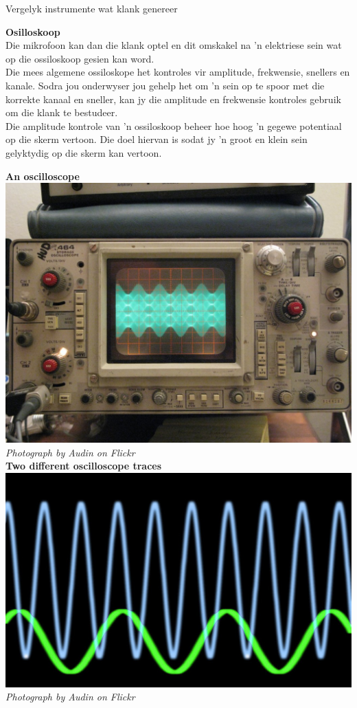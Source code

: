 \begin{activity}{Vergelyk instrumente wat klank genereer}
\begin{minipage}{.5\textwidth}

\textbf{Osilloskoop} \\
Die mikrofoon kan dan die klank optel en dit omskakel na 'n elektriese sein wat op die ossiloskoop gesien kan word.\\

Die mees algemene ossiloskope het kontroles vir amplitude, frekwensie, snellers en kanale. Sodra jou onderwyser jou gehelp het om 'n sein op te spoor met die korrekte kanaal en sneller, kan jy die amplitude en frekwensie kontroles gebruik om die klank te bestudeer.\\

Die amplitude kontrole van 'n ossiloskoop beheer hoe hoog 'n gegewe potentiaal op die skerm vertoon. Die doel hiervan is sodat jy 'n groot en klein sein gelyktydig op die skerm kan vertoon. \\

\end{minipage}
\begin{minipage}{.5\textwidth}
\begin{center}
\textbf{An oscilloscope}\\
\includegraphics[width=.8\textwidth]{../Grade10/photos/oscilloscope_Audin_Flickr.jpg}\\
\textsl{Photograph by Audin on Flickr}\\
\textbf{Two different oscilloscope traces}\\
\includegraphics[width=.8\textwidth]{../Grade10/photos/oscilloscopetrace_Creativity103_Flickr.jpg}\\
\textsl{Photograph by Audin on Flickr}\\
\end{center}
\end{minipage}


\end{activity}
